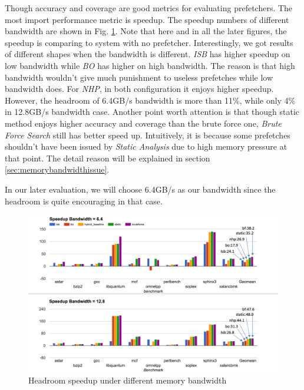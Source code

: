   Though accuracy and coverage are good metrics for evaluating prefetchers. The most import performance metric is speedup. The speedup numbers of different bandwidth are shown in Fig. \ref{fig:headroom_speedup}. Note that here and in all the later figures, the speedup is comparing to system with no prefetcher. Interestingly, we got results of different shapes when the bandwidth is different. \emph{ISB} has higher speedup on low bandwidth while \emph{BO} has higher on high bandwidth. The reason is that high bandwidth wouldn't give much punishment to useless prefetches while low bandwidth does. For \emph{NHP}, in both configuration it enjoys higher speedup. However, the headroom of 6.4GB/s bandwidth is more than 11\%, while only 4\% in 12.8GB/s bandwidth case. Another point worth attention is that though static method enjoys higher accuracy and coverage than the brute force one, \emph{Brute Force Search} still has better speed up. Intuitively, it is because some prefetches shouldn't have been issued by \emph{Static Analysis} due to high memory pressure at that point. The detail reason will be explained in section \ref{sec:memorybandwidthissue}.

  In our later evaluation, we will choose 6.4GB/s as our bandwidth since the headroom is quite encouraging in that case.


  \begin{figure}[ht!]
	   \centering
	   \includegraphics[width=1.0\textwidth]{images/headroom_speedup.png}
	   \caption{Headroom speedup under different memory bandwidth}
	  \label{fig:headroom_speedup}
  \end{figure}

